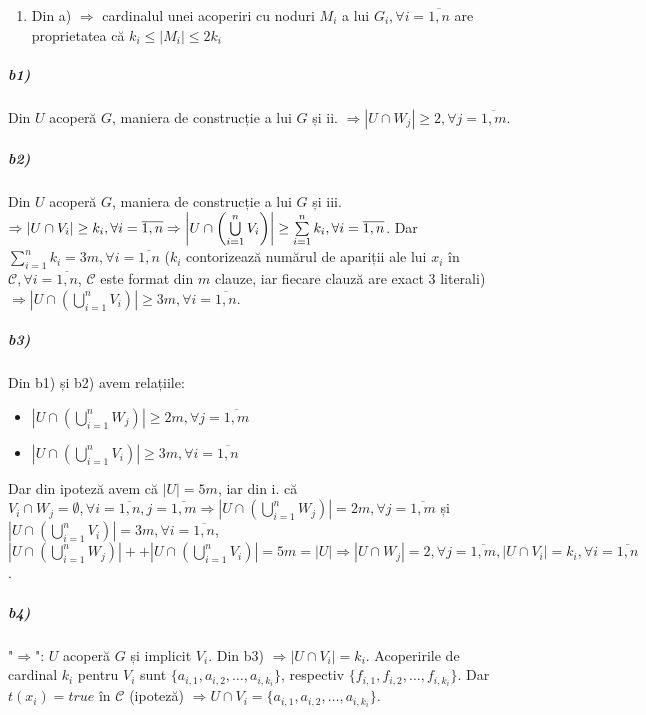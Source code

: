 \documentclass[a4paper,12pt]{article}
\begin{document}
{\begin{enumerate}
\item Din a) $\Rightarrow$ cardinalul unei acoperiri cu noduri $M_i$ a lui $G_i, \forall i = \overline{1, n}$ are proprietatea că $k_i \leq |M_i| \leq 2k_i$
\end{enumerate}

\subparagraph{b1)}

Din $U$ acoperă $G$, maniera de construcție a lui $G$ și ii. $\Rightarrow |U \cap W_j| \geq 2, \forall j = \overline{1, m}$.

\subparagraph{b2)}

Din $U$ acoperă $G$, maniera de construcție a lui $G$ și iii. $\Rightarrow |U \cap V_i| \geq k_i, \linebreak \forall i = \overline{1, n} \Rightarrow \left|U \cap \left(\bigcup\limits_{i=1}^n V_i\right)\right| \geq \sum\limits_{i=1}^n k_i, \forall i = \overline{1, n}$. Dar $\sum\limits_{i=1}^n k_i = 3m, \forall i = \overline{1, n}$ ($k_i$ contorizează numărul de apariții ale lui $x_i$ în $\mathcal{C}, \forall i = \overline{1, n}$, $\mathcal{C}$ este format din $m$ clauze, iar fiecare clauză are exact $3$ literali) $\Rightarrow \left|U \cap \left(\bigcup\limits_{i=1}^n V_i\right)\right| \geq 3m, \forall i = \overline{1, n}$.

\subparagraph{b3)}

Din b1) și b2) avem relațiile:
\renewcommand{\labelitemi}{$\ast$}
\begin{itemize}
	\item $\left|U \cap \left(\bigcup\limits_{i=1}^n W_j\right)\right| \geq 2m, \forall j = \overline{1, m}$
	\item $\left|U \cap \left(\bigcup\limits_{i=1}^n V_i\right)\right| \geq 3m, \forall i = \overline{1, n}$
\end{itemize}
Dar din ipoteză avem că $|U| = 5m$, iar din i. că $V_i \cap W_j = \emptyset, \forall i = \overline{1, n}, j = \overline{1, m} \Rightarrow \left|U \cap \left(\bigcup\limits_{i=1}^n W_j\right)\right| = 2m, \forall j = \overline{1, m}$ și $\left|U \cap \left(\bigcup\limits_{i=1}^n V_i\right)\right| = 3m, \forall i = \overline{1, n}$, $\left|U \cap \left(\bigcup\limits_{i=1}^n W_j\right)\right| +  + \left|U \cap \left(\bigcup\limits_{i=1}^n V_i\right)\right| = 5m = |U|\Rightarrow |U \cap W_j| = 2, \forall j = \overline{1, m}, |U \cap V_i| = k_i, \forall i = \overline{1, n}$.

\subparagraph{b4)}

"$\Rightarrow$": $U$ acoperă $G$ și implicit $V_i$. Din b3) $\Rightarrow |U \cap V_i| = k_i$. Acoperirile de cardinal $k_i$ pentru $V_i$ sunt $\{a_{i,1},a_{i,2},\dotsc,a_{i,k_i}\}$, respectiv  $\{f_{i,1},f_{i,2},\dotsc,f_{i,k_i}\}$. Dar $t(x_i) = true$ în $\mathcal{C}$ (ipoteză) $\Rightarrow U \cap V_i = \{a_{i,1},a_{i,2},\dotsc,a_{i,k_i}\}$.

}
\end{document}
